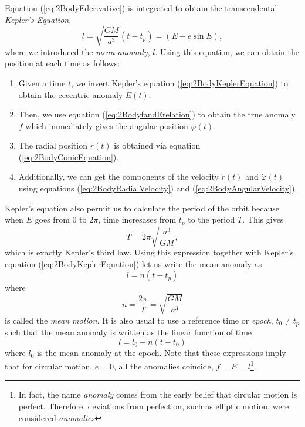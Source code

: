  Equation (\ref{eq:2BodyEderivative}) is integrated to obtain the transcendental \textit{Kepler's Equation},
 \begin{equation}
l = \sqrt{\frac{GM}{a^3}} \left( t-t_p \right) =  \left( E - e \sin E \right), \label{eq:2BodyKeplerEquation}
 \end{equation}
where we introduced the \textit{mean anomaly}, $l$. Using this equation, we can obtain the position at each time as follows: 
\begin{enumerate}
\item Given a time $t$, we invert Kepler's equation (\ref{eq:2BodyKeplerEquation}) to obtain the eccentric anomaly $E(t)$.

\item Then, we use equation (\ref{eq:2BodyfandErelation}) to obtain the true anomaly $f$ which immediately gives the angular position $\varphi(t)$.

\item The radial position $r(t)$ is obtained via equation (\ref{eq:2BodyConicEquation}). 

\item Additionally, we can get the components of the velocity $\dot{r}(t)$ and $\dot{\varphi} (t)$ using equations (\ref{eq:2BodyRadialVelocity}) and (\eqref{eq:2BodyAngularVelocity}).
\end{enumerate}

Kepler's equation also permit us to calculate the period of the orbit because when $E$ goes from $0$ to $2\pi$, time incresases from $t_p$ to the period $T$. This gives
\begin{equation}
T = 2\pi \sqrt{\frac{a^3}{GM}},
\end{equation}
which is exactly Kepler's third law. Using this expression together with Kepler's equation (\ref{eq:2BodyKeplerEquation}) let us write the mean anomaly as
\begin{equation}
l = n \left( t- t_p \right)
\end{equation}
where 
\begin{equation}
n = \frac{2\pi }{T} = \sqrt{\frac{GM}{a^3}}
\end{equation}
is called the \textit{mean motion}. It is also usual to use a reference time  or \textit{epoch}, $t_0 \neq t_p$ such that the mean anomaly is written as the linear function of time
\begin{equation}
l = l_0 + n (t - t_0)
\end{equation}
where $l_0$ is the mean anomaly at the epoch. Note that these expressions imply that for circular motion, $e=0$, all the anomalies coincide, $f=E=l$\footnote{In fact, the name \textit{anomaly} comes from the early belief that circular motion is perfect. Therefore, deviations from perfection, such as elliptic motion, were considered \textit{anomalies}}.

